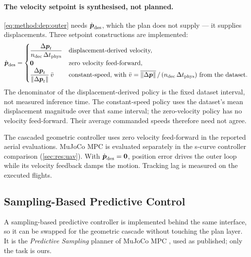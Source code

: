 \paragraph{The velocity setpoint is synthesised, not planned.} \eqref{eq:method:dep:outer} needs
$\dot{\boldsymbol{p}}_{\textrm{des}}$, which the plan does not supply --- it supplies displacements. Three
setpoint constructions are implemented:
\begin{equation}\label{eq:method:dep:vdes}
  \dot{\boldsymbol{p}}_{\textrm{des}} =
  \begin{cases}
    \dfrac{\Delta\boldsymbol{p}_{t}}{n_{\textrm{dec}}\,\Delta t_{\textrm{phys}}} & \text{displacement-derived velocity,}\\
    \boldsymbol{0} & \text{zero velocity feed-forward,}\\
    \dfrac{\Delta\boldsymbol{p}_{t}}{\|\Delta\boldsymbol{p}_{t}\|}\,\bar{v} & \text{constant-speed, with }
      \bar{v} = \overline{\|\Delta\boldsymbol{p}\|}\,/\,(n_{\textrm{dec}}\,\Delta t_{\textrm{phys}})\text{ from the dataset.}
  \end{cases}
\end{equation}
The denominator of the displacement-derived policy is the fixed dataset interval, not measured
inference time. The constant-speed policy uses the dataset's mean displacement magnitude over that
same interval; the zero-velocity policy has no velocity feed-forward. Their average commanded
speeds therefore need not agree.

The cascaded geometric controller uses zero velocity feed-forward in the reported aerial evaluations.
MuJoCo MPC is evaluated separately in the s-curve controller comparison
(\autoref{sec:res:uav}). With $\dot{\boldsymbol{p}}_{\textrm{des}}=\boldsymbol{0}$, position error drives the outer
loop while its velocity feedback damps the motion. Tracking lag is measured on the executed flights.

\subsection{Sampling-Based Predictive Control}\label{sec:method:mjpc}

A sampling-based predictive controller is
implemented behind the same interface, so it can be swapped for the geometric cascade without
touching the plan layer. It is the \emph{Predictive Sampling} planner of MuJoCo MPC \parencite{howell2022predictive}, used
as published; only the task is ours.


